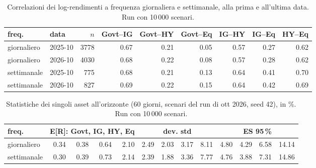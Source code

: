 \begin{table}[htbp]\centering\small\setlength{\tabcolsep}{3.5pt}
\caption{Correlazioni dei log-rendimenti a frequenza giornaliera e settimanale, alla prima e all'ultima data. Run con 10\,000 scenari.}\label{tab:corr_10k}
\begin{tabular}{llrrrrrrr}\toprule
freq. & data & $n$ & Govt--IG & Govt--HY & Govt--Eq & IG--HY & IG--Eq & HY--Eq \\\midrule
giornaliero & 2025-10 & 3778 & 0.67 & 0.21 & 0.05 & 0.57 & 0.27 & 0.62 \\
giornaliero & 2026-10 & 4030 & 0.68 & 0.22 & 0.08 & 0.57 & 0.28 & 0.62 \\
settimanale & 2025-10 & 775 & 0.68 & 0.21 & 0.13 & 0.64 & 0.41 & 0.70 \\
settimanale & 2026-10 & 827 & 0.69 & 0.22 & 0.15 & 0.64 & 0.42 & 0.69 \\
\bottomrule\end{tabular}\end{table}

\begin{table}[htbp]\centering\small\setlength{\tabcolsep}{3.5pt}
\caption{Statistiche dei singoli asset all'orizzonte (60 giorni, scenari del run di ott 2026, seed 42), in \%. Run con 10\,000 scenari.}\label{tab:assets_10k}
\begin{tabular}{lrrrrrrrrrrrr}\toprule
freq. & \multicolumn{4}{c}{E[R]: Govt, IG, HY, Eq} & \multicolumn{4}{c}{dev. std} & \multicolumn{4}{c}{ES 95\,\%} \\\midrule
giornaliero & 0.34 & 0.38 & 0.64 & 2.10 & 2.49 & 2.03 & 3.17 & 8.11 & 4.80 & 4.29 & 6.58 & 14.14 \\
settimanale & 0.30 & 0.39 & 0.73 & 2.14 & 2.39 & 1.88 & 3.36 & 7.77 & 4.76 & 3.88 & 7.31 & 14.86 \\
\bottomrule\end{tabular}\end{table}
